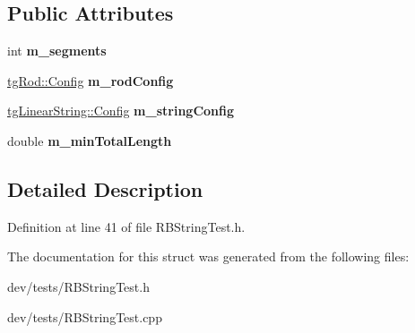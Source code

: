 \subsection*{Public Attributes}
\begin{DoxyCompactItemize}
\item 
\hypertarget{struct_r_b_string_test_1_1_config_a5cfa2fc389ff0767f2814cf5175e9822}{int {\bfseries m\-\_\-segments}}\label{struct_r_b_string_test_1_1_config_a5cfa2fc389ff0767f2814cf5175e9822}

\item 
\hypertarget{struct_r_b_string_test_1_1_config_a58993dfb6faa7ae2786c1b56e8b0b051}{\hyperlink{structtg_rod_1_1_config}{tg\-Rod\-::\-Config} {\bfseries m\-\_\-rod\-Config}}\label{struct_r_b_string_test_1_1_config_a58993dfb6faa7ae2786c1b56e8b0b051}

\item 
\hypertarget{struct_r_b_string_test_1_1_config_aad28f4f3700c30f4edad9a45035e2d63}{\hyperlink{structtg_base_string_1_1_config}{tg\-Linear\-String\-::\-Config} {\bfseries m\-\_\-string\-Config}}\label{struct_r_b_string_test_1_1_config_aad28f4f3700c30f4edad9a45035e2d63}

\item 
\hypertarget{struct_r_b_string_test_1_1_config_ab09fde86fa4b9ea1f5fd3afbccb83dc8}{double {\bfseries m\-\_\-min\-Total\-Length}}\label{struct_r_b_string_test_1_1_config_ab09fde86fa4b9ea1f5fd3afbccb83dc8}

\end{DoxyCompactItemize}


\subsection{Detailed Description}


Definition at line 41 of file R\-B\-String\-Test.\-h.



The documentation for this struct was generated from the following files\-:\begin{DoxyCompactItemize}
\item 
dev/tests/R\-B\-String\-Test.\-h\item 
dev/tests/R\-B\-String\-Test.\-cpp\end{DoxyCompactItemize}
